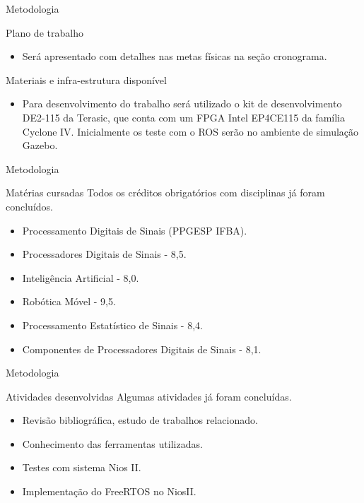 \documentclass[10pt]{beamer}
\begin{document}
{
\begin{frame}{Metodologia}
	\begin{alertblock}{Plano de trabalho}
	    \begin{itemize}
	        \item Será apresentado com detalhes nas metas físicas na seção cronograma.
	    \end{itemize}
	\end{alertblock}
	
	\begin{alertblock}{Materiais e infra-estrutura disponível}
	    \begin{itemize}
	        \item Para desenvolvimento do trabalho será utilizado o kit de desenvolvimento DE2-115
        da Terasic, que conta com um FPGA Intel EP4CE115 da família Cyclone IV. Inicialmente
        os teste com o ROS serão no ambiente de simulação Gazebo.
        \end{itemize}
	\end{alertblock}
	
\end{frame}
}

{
\begin{frame}{Metodologia}
	\begin{alertblock}{Matérias cursadas}
	Todos os créditos obrigatórios com disciplinas já foram concluídos.
	    \begin{itemize}
	        \item Processamento Digitais de Sinais (PPGESP IFBA).
	        \item Processadores Digitais de Sinais - 8,5.
	        \item Inteligência Artificial - 8,0.
	        \item Robótica Móvel - 9,5.
	        \item Processamento Estatístico de Sinais - 8,4.
	        \item Componentes de Processadores Digitais de Sinais - 8,1.
	    \end{itemize}
	\end{alertblock}
	
\end{frame}
}

{
\begin{frame}{Metodologia}
	\begin{alertblock}{Atividades desenvolvidas}
	Algumas atividades já foram concluídas.
	    \begin{itemize}
	        \item Revisão bibliográfica, estudo de trabalhos relacionado.
	        \item Conhecimento das ferramentas utilizadas.
	        \item Testes com sistema Nios II.
	        \item Implementação do FreeRTOS no NiosII.
	    \end{itemize}
	\end{alertblock}
	
\end{frame}
}
\end{document}
